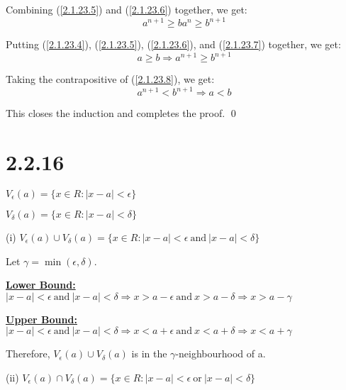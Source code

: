 \documentclass{article}
\begin{document}
\noindent
Combining (\ref{2.1.23.5}) and (\ref{2.1.23.6}) together, we get:
\begin{equation}
  a^{n+1} \geq ba^n \geq b^{n+1} \label{2.1.23.7}
\end{equation}

\noindent
Putting (\ref{2.1.23.4}), (\ref{2.1.23.5}), (\ref{2.1.23.6}), and (\ref{2.1.23.7}) together, we get:
\begin{equation}
  a \geq b \Rightarrow a^{n+1} \geq b^{n+1}  \label{2.1.23.8}
\end{equation}

\noindent
Taking the contrapositive of (\ref{2.1.23.8}), we get:
\begin{equation}
  a^{n+1} < b^{n+1} \Rightarrow a < b
\end{equation}

\noindent
This closes the induction and completes the proof.
\qed
\newline

\section*{2.2.16}

$V_{\epsilon}(a) = \{x \in R: |x-a| < \epsilon\}$

\noindent
$V_{\delta}(a) = \{x \in R: |x-a| < \delta\}$
\newline

\noindent
(i) $V_{\epsilon}(a) \cup V_{\delta}(a) = \{x \in R: |x-a| < \epsilon \ \text{and} \ |x-a| < \delta\}$
\newline

\noindent
Let $\gamma = \min(\epsilon, \delta)$.
\newline

\noindent
\textbf{\underline{Lower Bound:}}
$|x-a| < \epsilon \ \text{and} \ |x-a| < \delta \Rightarrow x > a-\epsilon \ \text{and} \ x > a-\delta \Rightarrow x > a-\gamma$
\newline

\noindent
\textbf{\underline{Upper Bound:}}
$|x-a| < \epsilon \ \text{and} \ |x-a| < \delta \Rightarrow x < a+\epsilon \ \text{and} \ x < a+\delta \Rightarrow x < a+\gamma$
\newline

\noindent
Therefore, $V_{\epsilon}(a) \cup V_{\delta}(a)$ is in the $\gamma$-neighbourhood of a.
\newline

\noindent
(ii) $V_{\epsilon}(a) \cap V_{\delta}(a) = \{x \in R: |x-a| < \epsilon \ \text{or} \ |x-a| < \delta\}$
\newline
\end{document}
